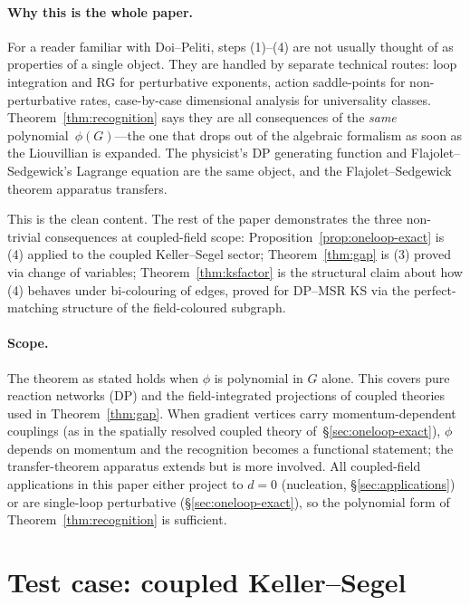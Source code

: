 \documentclass[11pt,a4paper]{article}
\theoremstyle{plain}
\begin{document}
\paragraph{Why this is the whole paper.}
For a reader familiar with Doi--Peliti, steps (1)--(4) are not
usually thought of as properties of a single object.  They are
handled by separate technical routes: loop integration and RG for
perturbative exponents, action saddle-points for non-perturbative
rates, case-by-case dimensional analysis for universality classes.
Theorem~\ref{thm:recognition} says they are all consequences of
the \emph{same} polynomial~$\phi(G)$---the one that drops out of
the algebraic formalism as soon as the Liouvillian is expanded.
The physicist's DP generating function and Flajolet--Sedgewick's
Lagrange equation are the same object, and the Flajolet--Sedgewick
theorem apparatus transfers.

This is the clean content.  The rest of the paper demonstrates the
three non-trivial consequences at coupled-field scope:
Proposition~\ref{prop:oneloop-exact} is (4) applied to the
coupled Keller--Segel sector; Theorem~\ref{thm:gap} is (3) proved
via change of variables; Theorem~\ref{thm:ksfactor} is the
structural claim about how (4) behaves under bi-colouring of
edges, proved for DP--MSR KS via the perfect-matching structure
of the field-coloured subgraph.

\paragraph{Scope.}
The theorem as stated holds when $\phi$ is polynomial in $G$
alone.  This covers pure reaction networks (DP) and the
field-integrated projections of coupled theories used in
Theorem~\ref{thm:gap}.  When gradient vertices carry
momentum-dependent couplings (as in the spatially resolved
coupled theory of~\S\ref{sec:oneloop-exact}), $\phi$ depends on
momentum and the recognition becomes a functional statement; the
transfer-theorem apparatus extends but is more involved.  All
coupled-field applications in this paper either project to $d = 0$
(nucleation, \S\ref{sec:applications}) or are single-loop
perturbative (\S\ref{sec:oneloop-exact}), so the polynomial form
of Theorem~\ref{thm:recognition} is sufficient.

\section{Test case: coupled Keller--Segel}
\end{document}
